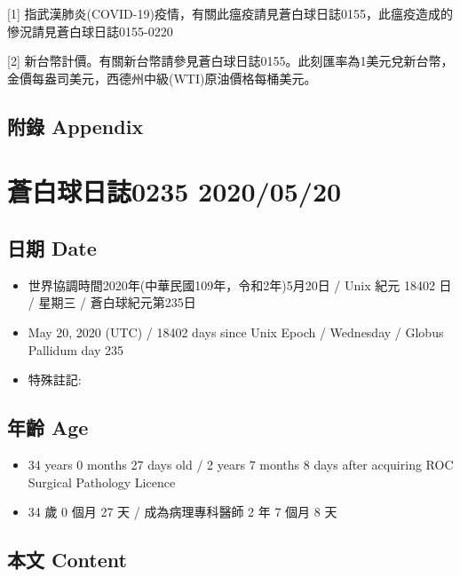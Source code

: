 \documentclass[
]{article}
\providecommand{\tightlist}{%
  \setlength{\itemsep}{0pt}\setlength{\parskip}{0pt}}
\begin{document}
{[}1{]}
指武漢肺炎(COVID-19)疫情，有關此瘟疫請見蒼白球日誌0155，此瘟疫造成的慘況請見蒼白球日誌0155-0220

{[}2{]}
新台幣計價。有關新台幣請參見蒼白球日誌0155。此刻匯率為1美元兌新台幣，金價每盎司美元，西德州中級(WTI)原油價格每桶美元。

\hypertarget{ux9644ux9304-appendix-18}{%
\subsection{附錄 Appendix}\label{ux9644ux9304-appendix-18}}

\hypertarget{ux84bcux767dux7403ux65e5ux8a8c0235-20200520}{%
\section{蒼白球日誌0235
2020/05/20}\label{ux84bcux767dux7403ux65e5ux8a8c0235-20200520}}

\hypertarget{ux65e5ux671f-date-19}{%
\subsection{日期 Date}\label{ux65e5ux671f-date-19}}

\begin{itemize}
\tightlist
\item
  世界協調時間2020年(中華民國109年，令和2年)5月20日 / Unix 紀元 18402 日
  / 星期三 / 蒼白球紀元第235日
\item
  May 20, 2020 (UTC) / 18402 days since Unix Epoch / Wednesday / Globus
  Pallidum day 235
\item
  特殊註記:
\end{itemize}

\hypertarget{ux5e74ux9f61-age-19}{%
\subsection{年齡 Age}\label{ux5e74ux9f61-age-19}}

\begin{itemize}
\tightlist
\item
  34 years 0 months 27 days old / 2 years 7 months 8 days after
  acquiring ROC Surgical Pathology Licence
\item
  34 歲 0 個月 27 天 / 成為病理專科醫師 2 年 7 個月 8 天
\end{itemize}

\hypertarget{ux672cux6587-content-19}{%
\subsection{本文 Content}\label{ux672cux6587-content-19}}
\end{document}
